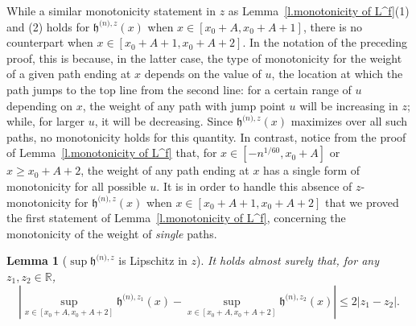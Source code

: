 \documentclass[oneside,final,11pt]{amsart}
\newtheorem{lemma}[thm]{Lemma}
\theoremstyle{definition}
\newcommand{\fh}{\mathfrak{h}}
\newcommand{\hz}[1]{\fh^{{\scriptscriptstyle(}n{\scriptscriptstyle)},#1}}
\newcommand{\R}{\mathbb{R}}
\newcommand{\1}[1]{\mathbf{1}_{#1}}
\numberwithin{equation}{section}
\begin{document}
While a similar monotonicity statement in $z$ as Lemma~\ref{l.monotonicity of L^f}(1) and (2) holds for $\hz{z}(x)$ when $x\in [x_0+A, x_0+A+1]$, there is no counterpart when $x\in [x_0+A+1, x_0+A+2]$. In the notation of the preceding proof, this is because, in the latter case, the type of monotonicity for the weight of a given path ending at $x$ depends on the value of $u$, the location at which the path jumps to the top line from the second line: for a certain range of $u$ depending on $x$, the weight of any path with jump point $u$ will be increasing in $z$; while, for larger $u$, it will be decreasing. Since $\hz{z}(x)$ maximizes over all such paths, no monotonicity holds for this quantity.
In contrast, notice from the proof of Lemma~\ref{l.monotonicity of L^f} that, for $x\in[-n^{1/60}, x_0+A]$ or $x\geq x_0+A+2$, the weight of any path ending at $x$ has a single form of monotonicity for all possible $u$. It is in order to handle this absence of $z$-monotonicity for $\hz{z}(x)$ when $x\in [x_0+A+1, x_0+A+2]$ that we proved the first statement of Lemma~\ref{l.monotonicity of L^f}, concerning the monotonicity of the weight of \emph{single} paths.


\begin{lemma}[$\sup \hz{z}$ is Lipschitz in $z$]\label{l.lipschitz}
It holds almost surely that, for any $z_1, z_2\in \R$,
%
$$\left|\sup_{x\in [x_0+A,x_0+A+ 2]}\hz{z_1}(x) - \sup_{x\in[x_0+A,x_0+A+ 2]}\hz{z_2}(x)\right| \leq 2 |z_1-z_2|.$$
\end{lemma}
\end{document}
